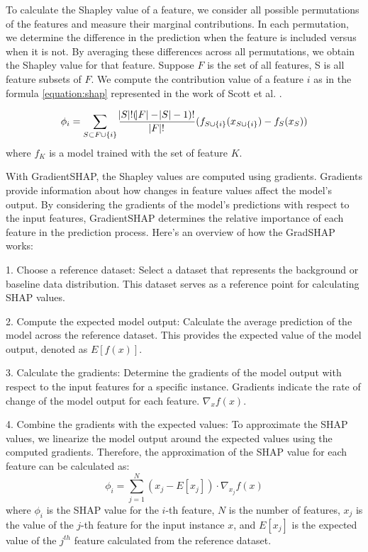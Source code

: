 To calculate the Shapley value of a feature, we consider all possible permutations of the features and measure their marginal contributions. In each permutation, we determine the difference in the prediction when the feature is included versus when it is not. By averaging these differences across all permutations, we obtain the Shapley value for that feature. Suppose $F$ is the set of all features, S is all feature subsets of $F$. We compute the contribution value of a feature $i$ as in the formula \ref{equation:shap} represented in the work of Scott et al. \cite{shap}.

\begin{equation}
\label{equation:shap}
\phi_i = \sum_{S \subset F \cup \{i\}} \frac{\abs{S}!(\abs{F} - \abs{S} - 1)!}{\abs{F}! } ( f_{S \cup \{ i \}} ( x_{ S \cup \{ i \}} ) - f_S (x_S) )
\end{equation}
where $f_K$ is a model trained with the set of feature $K$.

With GradientSHAP, the Shapley values are computed using gradients. Gradients provide information about how changes in feature values affect the model's output. By considering the gradients of the model's predictions with respect to the input features, GradientSHAP determines the relative importance of each feature in the prediction process. Here's an overview of how the GradSHAP works:
 
1. Choose a reference dataset: Select a dataset that represents the background or baseline data distribution. This dataset serves as a reference point for calculating SHAP values.
 
2. Compute the expected model output: Calculate the average prediction of the model across the reference dataset. This provides the expected value of the model output, denoted as $E[f(x)]$.
 
3. Calculate the gradients: Determine the gradients of the model output with respect to the input features for a specific instance. Gradients indicate the rate of change of the model output for each feature. $\nabla_x f(x)$.
 
4. Combine the gradients with the expected values: To approximate the SHAP values, we linearize the model output around the expected values using the computed gradients. Therefore, the approximation of the SHAP value for each feature can be calculated as:
$$\phi_i = \sum_{j=1}^N (x_j - E[x_j]) \cdot \nabla_{x_j} f(x)$$
where $\phi_i$ is the SHAP value for the $i$-th feature, $N$ is the number of features, $x_j$ is the value of the $j$-th feature for the input instance $x$, and $E[x_j]$ is the expected value of the $j^{th}$ feature calculated from the reference dataset.
 
